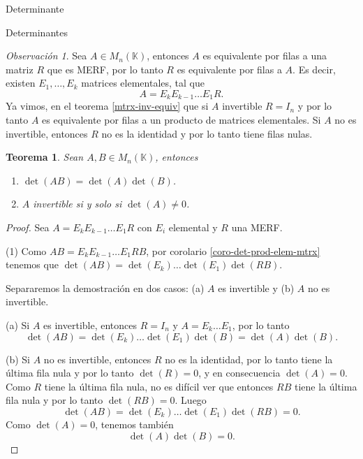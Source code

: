 \documentclass[a4paper,12pt,twoside,spanish]{amsbook}
\newtheorem{teorema}{Teorema}[section]
\theoremstyle{definition}
\theoremstyle{remark}
\newtheorem{obs}{Observaci\'on}[section]
\newcommand{\K}{\mathbb K}
\begin{document}
\begin{chapter}{Determinante}
\begin{section}{Determinantes}
		 
		 \begin{obs}\label{mtrx-elem-por-merf}
		 	Sea $A  \in M_n(\K)$,  entonces $A$ es equivalente por filas a una matriz $R$ que es  MERF, por lo tanto $R$ es equivalente por filas a $A$. Es decir, existen $E_1,\ldots,E_k$ matrices elementales, tal que
		 	\begin{equation}
		 	A = E_kE_{k-1}\ldots E_1R.
		 	\end{equation}
		 	Ya vimos,  en el  teorema \ref{mtrx-inv-equiv} que si $A$ invertible $R= I_n$ y por lo tanto  $A$ es equivalente por filas a un producto de  matrices elementales. Si $A$ no es invertible, entonces $R$ no es la identidad y por lo tanto tiene filas nulas. 
		 \end{obs}
		
		 
		 
		 \begin{teorema}\label{th-dem-detAB}  Sean $A,B \in M_n(\K)$,  entonces
		 	\begin{enumerate}
		 		\item $\det (A B) = \det(A)\det(B)$. 
		 		\item $A$ invertible si y solo si  $\det(A)\ne0$.
		 	\end{enumerate}
		 \end{teorema}
		 \begin{proof} 	
		 		Sea $A = E_kE_{k-1}\ldots E_1R$ con $E_i$  elemental y $R$ una MERF.
		 	
		 	(1) Como $AB = E_kE_{k-1}\ldots E_1RB$, por corolario \ref{coro-det-prod-elem-mtrx}  tenemos que  $\det(AB) = \det( E_k) \ldots \det(E_1)\det(RB)$.
		 	
		 	
		 	Separaremos la demostración en dos casos: (a) $A$ es invertible y  (b) $A$ no es invertible. 
		 	
		 	(a) Si $A$  es invertible,  entonces $R=I_n$ y  $A = E_k\ldots E_1$, por lo tanto 
		 	\begin{equation*}
		 	\det(AB) = \det(E_k) \ldots \det(E_1)\det(B) = \det(A)\det(B).
		 	\end{equation*}
		 	
		 	(b) Si $A$ no es invertible, entonces $R$ no es la identidad, por lo tanto tiene la última fila nula y por lo tanto $\det(R)=0$, y en consecuencia $\det(A)=0$. Como $R$ tiene la última fila nula, no es difícil ver que entonces $RB$ tiene la última fila nula y por lo tanto $\det(RB)=0$. Luego 
		 	$$
		 	\det(AB) = \det( E_k) \ldots \det(E_1)\det(RB) =0.
		 	$$
		 	Como  $\det(A)=0$, tenemos también 
		 	$$
		 	\det(A)\det(B) =0.
		 	$$ 
		 	

\end{proof}
\end{section}
\end{chapter}
\end{document}

